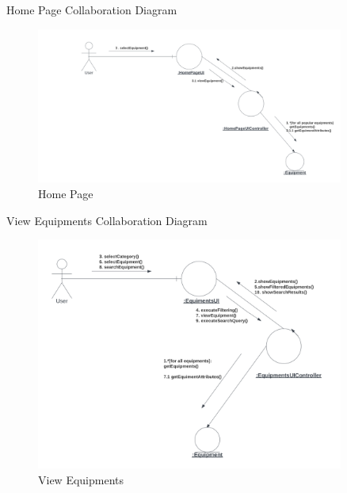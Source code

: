 \documentclass[20pt]{beamer}
\numberwithin{figure}{section}
\begin{document}
\begin{frame}{Home Page Collaboration Diagram}

     \begin{figure}
        \centering
        \includegraphics[width= 0.9\textwidth , height= 0.6\paperheight]{HomePageCollab.png}
        \caption{Home Page}
        \label{fig:18}
    \end{figure}

\end{frame}

\begin{frame}{View Equipments Collaboration Diagram}

     \begin{figure}
        \centering
        \includegraphics[width= 0.9\textwidth , height= 0.6\paperheight]{EquipmentsViewCollab.png}
        \caption{View Equipments}
        \label{fig:19}
    \end{figure}

\end{frame}
\end{document}
